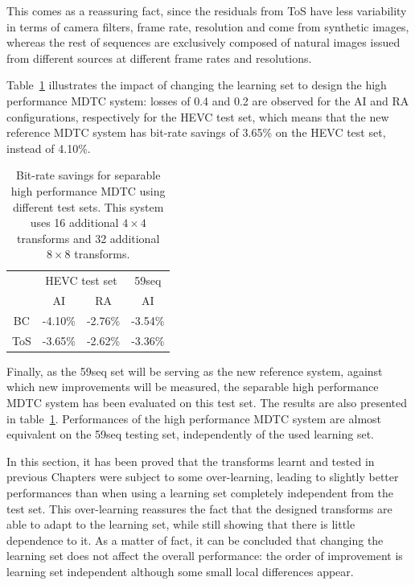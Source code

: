 \documentclass[11pt,a4paper,openright,twoside]{book}
\numberwithin{equation}{section} %
\numberwithin{figure}{section} %
\numberwithin{table}{section} %
\begin{document}
This comes as a reassuring fact, since the residuals from ToS have less
variability in terms of camera filters, frame rate, resolution and come from
synthetic images, whereas the rest of sequences are exclusively composed of
natural images issued from different sources at different frame rates and
resolutions.

Table~\ref{tab:cross_bdrate_learn} illustrates the impact of changing the
learning set to design the high performance \ac{MDTC} system: losses of 0.4
and 0.2 are observed for the \ac{AI} and \ac{RA} configurations, respectively
for the \ac{HEVC} test set, which means that the new reference \ac{MDTC}
system has bit-rate savings of 3.65\% on the \ac{HEVC} test set, instead of
4.10\%.

\begin{table}[tb]
	\centering
	\small
	\begin{tabular}{c|cc|c}
		& \multicolumn{2}{c|}{\acs{HEVC} test set} & 59seq \\
		\diagbox{Learn}{Test}
		& \acs{AI} & \acs{RA} & \acs{AI} \\
		\hline\hline
		BC  & -4.10\% & -2.76\% & -3.54\% \\
		ToS & -3.65\% & -2.62\% & -3.36\% \\
	\end{tabular}
	\caption[Bit-rate savings for separable high performance \acs{MDTC} using
	different test sets]
	{Bit-rate savings for separable high performance \acs{MDTC} using
	different test sets. This system uses 16 additional $4\times4$ transforms
	and 32 additional $8\times8$ transforms.}
	\label{tab:cross_bdrate_learn}
\end{table}

Finally, as the 59seq set will be serving as the new reference system, against
which new improvements will be measured, the separable high performance
\ac{MDTC} system has been evaluated on this test set.
The results are also presented in table~\ref{tab:cross_bdrate_learn}.
Performances of the high performance \ac{MDTC} system are almost equivalent on
the 59seq testing set, independently of the used learning set.

In this section, it has been proved that the transforms learnt and tested in
previous Chapters were subject to some over-learning, leading to slightly
better performances than when using a learning set completely independent from
the test set.
This over-learning reassures the fact that the designed transforms are able to
adapt to the learning set, while still showing that there is little dependence
to it.
As a matter of fact, it can be concluded that changing the learning set does
not affect the overall performance:
the order of improvement is learning set independent although some small local
differences appear.
\end{document}
